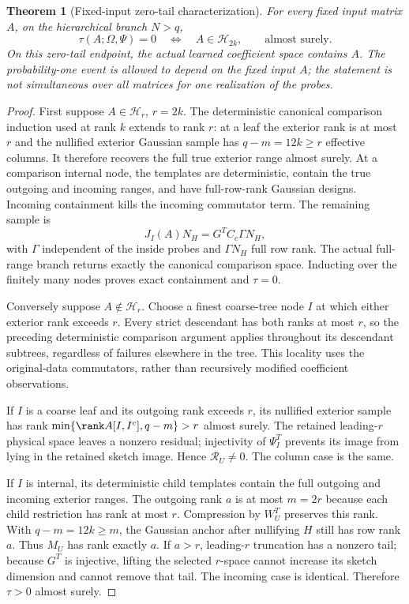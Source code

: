 \documentclass[11pt,oneside,openany,a4paper]{book}
\numberwithin{equation}{chapter}
\newtheorem{theorem}{Theorem}[chapter]
\theoremstyle{definition}
\theoremstyle{remark}
\newcommand{\HH}{\mathcal H}\newcommand{\SSS}{\mathcal S}
\begin{document}
\begin{theorem}[Fixed-input zero-tail characterization]\label{return:thm:zero}
For every fixed input matrix $A$, on the hierarchical branch $N>q$,
\begin{equation}\label{return:eq:zero}
 \boxed{\tau(A;\Omega,\Psi)=0
       \quad\Longleftrightarrow\quad A\in\HH_{2k},\qquad\text{almost surely}.}
\end{equation}
On this zero-tail endpoint, the actual learned coefficient space contains $A$. The probability-one event is allowed to depend on the fixed input $A$; the statement is not simultaneous over all matrices for one realization of the probes.
\end{theorem}
\begin{proof}
First suppose $A\in\HH_r$, $r=2k$. The deterministic canonical comparison induction used at rank $k$ extends to rank $r$: at a leaf the exterior rank is at most $r$ and the nullified exterior Gaussian sample has $q-m=12k\ge r$ effective columns. It therefore recovers the full true exterior range almost surely. At a comparison internal node, the templates are deterministic, contain the true outgoing and incoming ranges, and have full-row-rank Gaussian designs. Incoming containment kills the incoming commutator term. The remaining sample is
\[
 J_I(A)N_H=G^TC_c\Gamma N_H,
\]
with $\Gamma$ independent of the inside probes and $\Gamma N_H$ full row rank. The actual full-range branch returns exactly the canonical comparison space. Inducting over the finitely many nodes proves exact containment and $\tau=0$.

Conversely suppose $A\notin\HH_r$. Choose a finest coarse-tree node $I$ at which either exterior rank exceeds $r$. Every strict descendant has both ranks at most $r$, so the preceding deterministic comparison argument applies throughout its descendant subtrees, regardless of failures elsewhere in the tree. This locality uses the original-data commutators, rather than recursively modified coefficient observations.

If $I$ is a coarse leaf and its outgoing rank exceeds $r$, its nullified exterior sample has rank $\min\{\rank A[I,I^c],q-m\}>r$ almost surely. The retained leading-$r$ physical space leaves a nonzero residual; injectivity of $\Psi_I^T$ prevents its image from lying in the retained sketch image. Hence $\mathcal R_U\ne0$. The column case is the same.

If $I$ is internal, its deterministic child templates contain the full outgoing and incoming exterior ranges. The outgoing rank $a$ is at most $m=2r$ because each child restriction has rank at most $r$. Compression by $W_U^T$ preserves this rank. With $q-m=12k\ge m$, the Gaussian anchor after nullifying $H$ still has row rank $a$. Thus $M_U$ has rank exactly $a$. If $a>r$, leading-$r$ truncation has a nonzero tail; because $G^T$ is injective, lifting the selected $r$-space cannot increase its sketch dimension and cannot remove that tail. The incoming case is identical. Therefore $\tau>0$ almost surely.


\end{proof}
\end{document}
